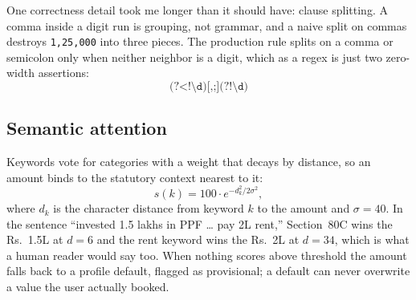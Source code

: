 \documentclass[conference]{IEEEtran}
\newcommand{\Rs}{Rs.~}
\begin{document}
One correctness detail took me longer than it should have: clause
splitting. A comma inside a digit run is grouping, not grammar, and a
naive split on commas destroys \texttt{1,25,000} into three pieces.
The production rule splits on a comma or semicolon only when neither
neighbor is a digit, which as a regex is just two zero-width
assertions:
\begin{equation}
\texttt{(?<!\textbackslash d)[,;](?!\textbackslash d)}
\end{equation}

\subsection{Semantic attention}
Keywords vote for categories with a weight that decays by distance, so
an amount binds to the statutory context nearest to it:
\begin{equation}
s(k) = 100 \cdot e^{-d_k^{2} / 2\sigma^{2}},
\label{eq:attn}
\end{equation}
where $d_k$ is the character distance from keyword $k$ to the amount
and $\sigma=40$. In the sentence ``invested 1.5 lakhs in PPF \ldots
pay 2L rent,'' Section~80C wins the \Rs{}1.5L at $d{=}6$ and the rent
keyword wins the \Rs{}2L at $d{=}34$, which is what a human reader
would say too. When nothing scores above threshold the amount falls
back to a profile default, flagged as provisional; a default can
never overwrite a value the user actually booked.
\end{document}
